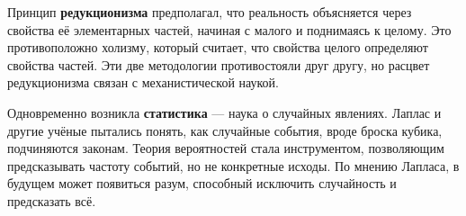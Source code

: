 Принцип \textbf{редукционизма} предполагал, что реальность объясняется через свойства её элементарных частей, начиная с малого и поднимаясь к целому. Это противоположно холизму, который считает, что свойства целого определяют свойства частей. Эти две методологии противостояли друг другу, но расцвет редукционизма связан с механистической наукой.

Одновременно возникла \textbf{статистика} --- наука о случайных явлениях. Лаплас и другие учёные пытались понять, как случайные события, вроде броска кубика, подчиняются законам. Теория вероятностей стала инструментом, позволяющим предсказывать частоту событий, но не конкретные исходы. По мнению Лапласа, в будущем может появиться разум, способный исключить случайность и предсказать всё.